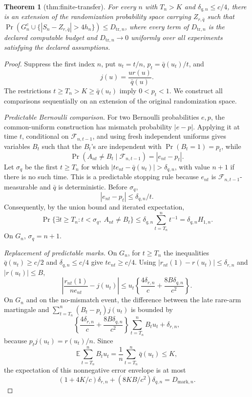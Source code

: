 \documentclass{article}
\newtheorem{theorem}{Theorem}
\begin{document}
\begin{theorem}[thm:finite-transfer]\label{thm:finite-transfer}
For every \(n\) with \(T_n>K\) and \(\delta_{q,n}\le c/4\), there is an extension of the randomization probability space carrying \(Z_{r,\bar q}\) such that \(\Pr(G_n^c\cup\{|S_n-Z_{r,\bar q}|>4h_n\})\le D_{\mathrm{tr},n}\), where every term of \(D_{\mathrm{tr},n}\) is the declared computable budget and \(D_{\mathrm{tr},n}\to0\) uniformly over all experiments satisfying the declared assumptions.
\end{theorem}
\begin{proof}
Suppress the first index \(n\), put \(u_t=t/n\), \(p_t=\bar q(u_t)/t\), and
\[
 j(u)=\frac{u r(u)}{\bar q(u)}.
\]
The restrictions \(t\geq T_n>K\geq\bar q(u_t)\) imply \(0<p_t<1\).
We construct all comparisons sequentially on an extension of the original randomization space.

\emph{Predictable Bernoulli comparison.}
For two Bernoulli probabilities \(e,p\), the common-uniform construction has mismatch probability \(|e-p|\).  Applying it at time \(t\), conditional on \(\mathcal F_{n,t-1}\), and using fresh independent uniforms gives variables \(B_t\) such that the \(B_t\)'s are independent with
\(\Pr(B_t=1)=p_t\), while
\[
 \Pr(A_{nt}\ne B_t\mid\mathcal F_{n,t-1})=|e_{nt}-p_t|.
\]
Let \(\sigma_q\) be the first \(t\geq T_n\) for which
\(|t e_{nt}-\bar q(u_t)|>\delta_{q,n}\), with value \(n+1\) if there is no such time.  This is a predictable stopping rule because \(e_{nt}\) is \(\mathcal F_{n,t-1}\)-measurable and \(\bar q\) is deterministic.  Before \(\sigma_q\),
\[
 |e_{nt}-p_t|\leq\delta_{q,n}/t.
\]
Consequently, by the union bound and iterated expectation,
\[
 \Pr\{\exists t\geq T_n:t<\sigma_q,\ A_{nt}\ne B_t\}
 \leq\delta_{q,n}\sum_{t=T_n}^n t^{-1}
 =\delta_{q,n}H_{1,n}.
\]
On \(G_n\), \(\sigma_q=n+1\).

\emph{Replacement of predictable marks.}
On \(G_n\), for \(t\geq T_n\) the inequalities
\(\bar q(u_t)\geq c/2\) and
\(\delta_{q,n}\leq c/4\) give \(t e_{nt}\geq c/4\).
Using \(|r_{nt}(1)-r(u_t)|\leq\delta_{r,n}\) and
\(|r(u_t)|\leq B\),
\[
 \left|\frac{r_{nt}(1)}{n e_{nt}}-j(u_t)\right|
 \leq u_t\left\{\frac{4\delta_{r,n}}{c}
              +\frac{8B\delta_{q,n}}{c^2}\right\}.
\]
On \(G_n\) and on the no-mismatch event, the difference between the late rare-arm martingale and
\(\sum_{t=T_n}^n(B_t-p_t)j(u_t)\) is bounded by
\[
 \left\{\frac{4\delta_{r,n}}{c}
              +\frac{8B\delta_{q,n}}{c^2}\right\}
       \sum_{t=T_n}^nB_tu_t+\delta_{r,n},
\]
because \(p_tj(u_t)=r(u_t)/n\).  Since
\[
 \mathbb E\sum_{t=T_n}^n B_tu_t
 =\frac1n\sum_{t=T_n}^n\bar q(u_t)\leq K,
\]
the expectation of this nonnegative error envelope is at most
\[
 (1+4K/c)\delta_{r,n}+(8KB/c^2)\delta_{q,n}
 =D_{\mathrm{mark},n}.
\]


\end{proof}
\end{document}
